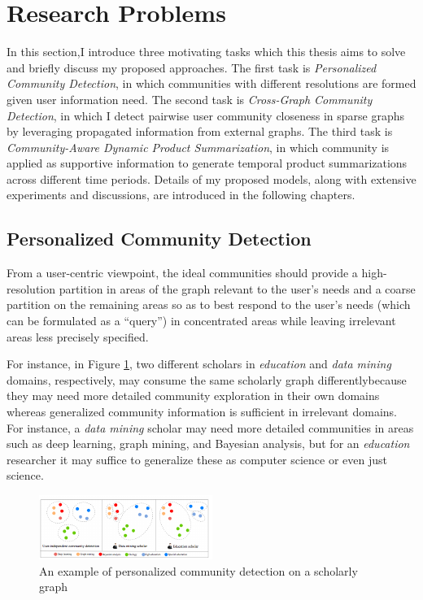 \section{Research Problems}
In this section,I introduce three motivating tasks which this thesis aims to solve and briefly discuss my proposed approaches. The first task is \textit{Personalized Community Detection}, in which communities with different resolutions are formed given user information need. The second task is \textit{Cross-Graph Community Detection}, in which I detect pairwise user community closeness in sparse graphs by leveraging propagated information from external graphs. The third task is \textit{Community-Aware Dynamic Product Summarization}, in which community  is applied as supportive information to generate temporal product summarizations across different time periods. Details of my proposed models, along with extensive experiments and discussions, are introduced in the following chapters.

\subsection{Personalized Community Detection}
From a user-centric viewpoint, the ideal communities should provide a high-resolution partition in areas of the graph relevant to the user’s needs and a coarse partition on the remaining areas so as to best respond to the user’s needs (which can be formulated as a ``query'') in concentrated areas while leaving irrelevant areas less precisely specified. 

For instance, in Figure \ref{fig:example}, two different scholars in \textit{education} and \textit{data mining} domains, respectively, may consume the same scholarly graph differentlybecause they may need more detailed community exploration in their own domains whereas generalized community information is sufficient in irrelevant domains. For instance, a \textit{data mining} scholar may need more detailed communities in areas such as deep learning, graph mining, and Bayesian analysis, but for an \textit{education} researcher it may suffice to generalize these as computer science or even just science.

\begin{figure}
	\center
	\includegraphics[width=0.8\columnwidth]{img/chapter3/example.pdf} 
	\caption{An example of personalized community detection on a scholarly graph} 
	\label{fig:example}
\end{figure}  

